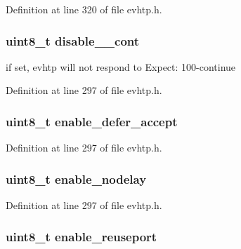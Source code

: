 Definition at line 320 of file evhtp.\-h.

\hypertarget{structevhtp__s_a080501d1bfb2e3144769e7e8ac9b7225}{
\subsubsection[{disable\-\_\-100\-\_\-cont}]{\setlength{\rightskip}{0pt plus 5cm}uint8\-\_\-t disable\-\_\-\_\-cont}}\label{structevhtp__s_a080501d1bfb2e3144769e7e8ac9b7225}
if set, evhtp will not respond to Expect\-: 100-\/continue 

Definition at line 297 of file evhtp.\-h.

\hypertarget{structevhtp__s_a9c0ae79aec9b8805cc2ff3fbc0d6eb77}{
\subsubsection[{enable\-\_\-defer\-\_\-accept}]{\setlength{\rightskip}{0pt plus 5cm}uint8\-\_\-t enable\-\_\-defer\-\_\-accept}}\label{structevhtp__s_a9c0ae79aec9b8805cc2ff3fbc0d6eb77}


Definition at line 297 of file evhtp.\-h.

\hypertarget{structevhtp__s_ac550f99410cfa96e60a714fd16a7665d}{
\subsubsection[{enable\-\_\-nodelay}]{\setlength{\rightskip}{0pt plus 5cm}uint8\-\_\-t enable\-\_\-nodelay}}\label{structevhtp__s_ac550f99410cfa96e60a714fd16a7665d}


Definition at line 297 of file evhtp.\-h.

\hypertarget{structevhtp__s_a6d985d690e3d26f87d8a7345c2226fed}{
\subsubsection[{enable\-\_\-reuseport}]{\setlength{\rightskip}{0pt plus 5cm}uint8\-\_\-t enable\-\_\-reuseport}}\label{structevhtp__s_a6d985d690e3d26f87d8a7345c2226fed}


